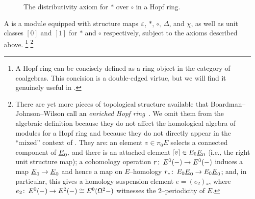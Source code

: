 \begin{figure}
\begin{center}
\end{center}
\caption{The distributivity axiom for \(\ast\) over \(\circ\) in a Hopf ring.}\label{DistributivityDiagram}
\end{figure}

\begin{definition}\label{HopfRingManualDefinition}
A  is a module equipped with structure maps \(\varepsilon\), \(\ast\), \(\circ\), \(\Delta\), and \(\chi\), as well as unit classes \([0]\) and \([1]\) for \(\ast\) and \(\circ\) respectively, subject to the axioms described above.%
\footnote{%
A Hopf ring can be concisely defined as a ring object in the category of coalgebras.
This concision is a double-edged virtue, but we will find it genuinely useful in .
}%
\footnote{%
There are yet more pieces of topological structure available that Boardman--Johnson--Wilson call an \textit{enriched Hopf ring}~\cite[Section 10]{BJW}.
We omit them from the algebraic definition because they do not affect the homological algebra of modules for a Hopf ring and because they do not directly appear in the ``mixed'' context of .
They are: an element \(v \in \pi_0 E\) selects a connected component of \(\OS{E}{0}\), and there is an attached element \([v] \in E_0 \OS{E}{0}\) (i.e., the right unit structure map); a cohomology operation \(r\colon\thinspace E^0(-) \to E^0(-)\) induces a map \(\OS{E}{0} \to \OS{E}{0}\) and hence a map on \(E\)--homology \(r_*\co E_0 \OS{E}{0} \to E_0 \OS{E}{0}\); and, in particular, this gives a homology suspension element \(e = (e_2)_*\), where \(e_2\colon\thinspace E^0(-) \to E^2(-) \cong E^0(\Omega^2 -)\) witnesses the \(2\)--periodicity of \(E\).
}
\end{definition}


